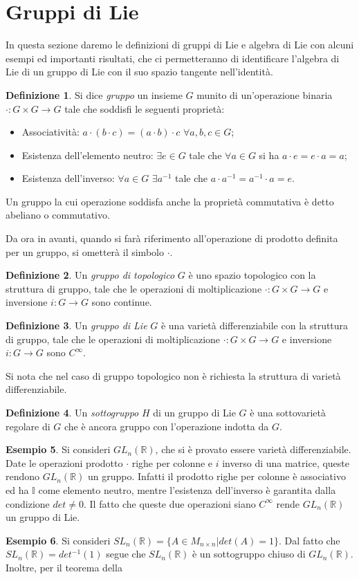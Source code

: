 \documentclass[12pt,a4paper]{report}
\theoremstyle{definition}
\newtheorem{Def}{Definizione}[chapter]
\theoremstyle{definition}
\newtheorem{Ex}[Def]{Esempio}
\theoremstyle{definition}
\theoremstyle{remark}
\begin{document}
\section{Gruppi di Lie}
In questa sezione daremo le definizioni di gruppi di Lie e algebra di Lie con alcuni esempi ed importanti risultati, che ci permetteranno di identificare l'algebra di Lie di un gruppo di Lie con il suo spazio tangente nell'identità.
\begin{Def}
	Si dice \textit{gruppo} un insieme $G$ munito di un'operazione binaria $\cdot:G\times G\rightarrow G$ tale che soddisfi le seguenti proprietà:
	\begin{itemize}
		\item Associatività: $a\cdot (b\cdot c)=(a\cdot b)\cdot c$ $\forall a,b,c\in G$;
		\item Esistenza dell'elemento neutro: $\exists e\in G$ tale che $\forall a\in G$ si ha $a\cdot e=e\cdot a=a$;
		\item Esistenza dell'inverso: $\forall a\in G$ $\exists a^{-1}$ tale che $a\cdot a^{-1}=a^{-1}\cdot a=e$.
	\end{itemize}
Un gruppo la cui operazione soddisfa anche la proprietà commutativa è detto abeliano o commutativo.
\end{Def}
Da ora in avanti, quando si farà riferimento all'operazione di prodotto definita per un gruppo, si ometterà il simbolo $\cdot$.\\
\begin{Def}
	Un \textit{gruppo di topologico} $G$ è uno spazio topologico con la struttura di gruppo, tale che le operazioni di moltiplicazione $\cdot:G\times G\rightarrow G$ e inversione $i:G\rightarrow G$ sono continue.
\end{Def}
\begin{Def}
	Un \textit{gruppo di Lie} $G$ è una varietà differenziabile con la struttura di gruppo, tale che le operazioni di moltiplicazione $\cdot:G\times G\rightarrow G$ e inversione $i:G\rightarrow G$ sono $C^\infty$.
\end{Def}
Si nota che nel caso di gruppo topologico non è richiesta la struttura di varietà differenziabile.
\begin{Def}
	Un \textit{sottogruppo} $H$ di un gruppo di Lie $G$ è una sottovarietà regolare di $G$ che è ancora gruppo con l'operazione indotta da $G$.
\end{Def}
\begin{Ex}
	Si consideri $GL_n(\mathbb{R})$, che si è provato essere varietà differenziabile. Date le operazioni prodotto $\cdot$ righe per colonne e $i$ inverso di una matrice, queste rendono $GL_n(\mathbb{R})$ un gruppo. Infatti il prodotto righe per colonne è associativo ed ha $\mathbb{I}$ come elemento neutro, mentre l'esistenza dell'inverso è garantita dalla condizione $det\neq 0$. Il fatto che queste due operazioni siano $C^\infty$ rende $GL_n(\mathbb{R})$ un gruppo di Lie.
\end{Ex}
\begin{Ex}
	Si consideri $SL_n(\mathbb{R})=\{A\in M_{n\times n}| det(A)=1\}$. Dal fatto che $SL_n(\mathbb{R})=det^{-1}(1)$ segue che $SL_n(\mathbb{R})$ è un sottogruppo chiuso di $GL_n(\mathbb{R})$. Inoltre, per il teorema della 
\end{Ex}
\end{document}
